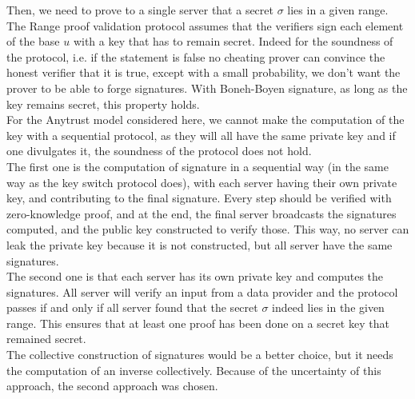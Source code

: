 \documentclass{article}
\begin{document}
Then, we need to prove to a single server that a secret $\sigma$ lies in a given range. 
The Range proof validation protocol assumes that the verifiers sign each element of the base $u$ with a key that has to remain secret. Indeed for the soundness of the protocol, i.e. if the statement is false no cheating prover can convince the honest verifier that it is true, except with a small probability, we don't want the prover to be able to forge signatures.
With Boneh-Boyen signature, as long as the key remains secret, this property holds.\\
For the Anytrust model considered here, we cannot make the computation of the key with a sequential protocol, as they will all have the same private key and if one divulgates it, the soundness of the protocol does not hold. \\
 The first one is the computation of signature in a sequential way (in the same way as the key switch protocol does), with each server having their own private key, and contributing to the final signature. Every step should be verified with zero-knowledge proof, and at the end, the final server broadcasts the signatures computed, and the public key constructed to verify those. This way, no server can leak the private key because it is not constructed, but all server have the same signatures. \\
The second one is that each server has its own private key and computes the signatures. All server will verify an input from a data provider and the protocol passes if and only if all server found that the secret $\sigma$ indeed lies in the given range. This ensures that at least one proof has been done on a secret key that remained secret.\\
The collective construction of signatures would be a better choice, but it needs the computation of an inverse collectively. Because of the uncertainty of this approach, the second approach was chosen.
\end{document}
